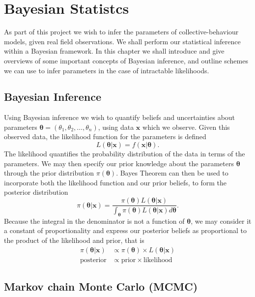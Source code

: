 \chapter{Bayesian Statistcs}	
\label{sec:bayes_intro}

As part of this project we wish to infer the parameters of collective-behaviour models, given real field observations. We shall perform our statistical inference within a Bayesian framework. In this chapter we shall introduce and give overviews of some important concepts of Bayesian inference, and outline schemes we can use to infer parameters in the case of intractable likelihoods.

\section{Bayesian Inference}
\label{ssec:bayes}

Using Bayesian inference we wish to quantify beliefs and uncertainties about parameters $\bm{\theta} = (\theta_1, \theta_2,\dots,\theta_n)$, using data $\bm{x}$ which we observe. Given this observed data, the likelihood function for the parameters is defined
\[
    L(\bm{\theta}|\bm{x}) = f(\bm{x}|\bm{\theta}).
\]
The likelihood quantifies the probability distribution of the data in terms of the parameters. We may then specify our prior knowledge about the parameters $\bm{\theta}$ through the prior distribution $\pi(\bm{\theta})$. Bayes Theorem can then be used to incorporate both the likelihood function and our prior beliefs, to form the posterior distribution
\begin{equation}
\label{eq:bayes_theorem}
    \pi(\bm{\theta}|\bm{x}) = \frac{\pi({\bm{\theta}})L(\bm{\theta}|\bm{x})}{\int_{\bm{\theta}} \pi(\bm{\theta})L(\bm{\theta}|\bm{x})d\bm{\theta}}.
\end{equation}
Because the integral in the denominator is not a function of $\bm{\theta}$, we may consider it a constant of proportionality and express our posterior beliefs as proportional to the product of the likelihood and prior, that is
\begin{align*}
    \pi(\bm{\theta}|\bm{x}) &\propto \pi(\bm{\theta}) \times L(\bm{\theta}|\bm{x})\\
    \text{posterior} &\propto \text{prior} \times \text{likelihood}
\end{align*}

\section{Markov chain Monte Carlo (MCMC)}
\label{ssec:mcmc}

